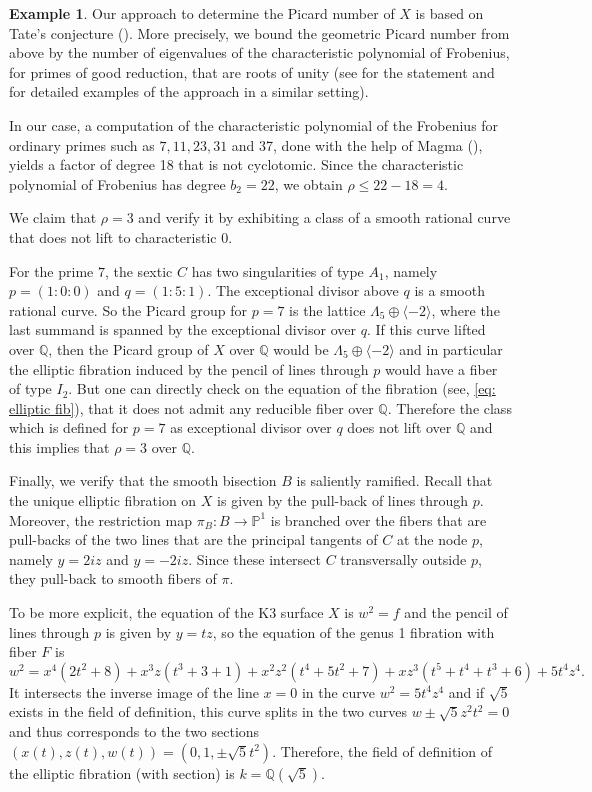 \documentclass{amsart}
\theoremstyle{definition}
\newtheorem{example}[theorem]{Example}
\numberwithin{equation}{section}
\newcommand{\Q}{\mathbb{Q}}
\begin{document}
\begin{example}
 Our approach to determine the Picard number of $X$ is based on Tate's conjecture (\cite{Tate}). More precisely, we bound the geometric Picard number from above by the number of eigenvalues of the characteristic polynomial of Frobenius, for primes of good reduction, that are roots of unity (see \cite[Corollary 2.3]{RvL} for the statement and \cite[Sec. 4]{EJ} for detailed examples of the approach in a similar setting).


In our case, a computation of the characteristic polynomial of the Frobenius for ordinary primes such as $7, 11, 23, 31$ and 37, done with the help of Magma (\cite{Magma}), yields a factor of degree 18 that is not cyclotomic.  Since the characteristic polynomial of Frobenius has degree $b_2=22$, we obtain $\rho\leq 22-18= 4$.

We claim that $\rho=3$ and verify it by exhibiting a class of a smooth rational curve that does not lift to characteristic 0. 

For the prime $7$, the sextic $C$ has two singularities of type $A_1$, namely $p=(1:0:0)$ and $q=(1:5:1)$. The exceptional divisor above $q$ is a smooth rational curve. So the Picard group for $p=7$ is the lattice $\Lambda_{5}\oplus \langle -2\rangle$, where the last summand is spanned by the exceptional divisor over $q$. If this curve lifted over $\mathbb{Q}$, then the Picard group of $X$ over $\Q$ would be $\Lambda_{5}\oplus \langle -2\rangle$ and in particular the elliptic fibration induced by the pencil of lines through $p$ would have a fiber of type $I_2$. But one can directly check on the equation of the fibration (see, \ref{eq: elliptic fib}), that it does not admit any reducible fiber over $\Q$. Therefore the class which is defined for $p=7$ as exceptional divisor over $q$ does not lift over $\Q$ and this implies that $\rho=3$ over $\Q$. 


Finally, we verify that the smooth bisection $B$ is saliently ramified. Recall that the unique elliptic fibration on $X$ is given by the pull-back of lines through $p$. Moreover, the restriction map $\pi_B: B\rightarrow \mathbb{P}^1$ is branched over the fibers that are pull-backs of the two lines that are the principal tangents of $C$ at the node $p$, namely $y=2iz$ and $y=-2iz$. Since these intersect $C$ transversally outside $p$, they pull-back to smooth fibers of $\pi$. 

To be more explicit, the equation of the K3 surface $X$ is $w^2=f$ and the pencil of lines through $p$ is given by $y=tz$, so the equation of the genus 1 fibration with fiber $F$ is 
\begin{equation}\label{eq: elliptic fib}
w^2=x^4(2t^2  + 8) + x^3z(t^3 + 3 + 1)  + x^2z^2(t^4 + 5t^2 + 7) + xz^3(t^5+t^4 +t^3 + 6)+ 5t^4z^4.\end{equation}
It intersects the inverse image of the line $x=0$ in the curve $w^2=5t^4z^4$ and if $\sqrt{5}$ exists in the field of definition, this curve splits in the two curves $w\pm\sqrt{5}z^2t^2=0$ and thus corresponds to the two sections $(x(t),z(t),w(t))=(0,1,\pm\sqrt{5}t^2)$. Therefore, the field of definition of the elliptic fibration (with section) is $k=\Q(\sqrt{5})$. 


\end{example}
\end{document}
